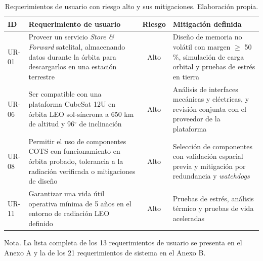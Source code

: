 \begin{table}[H]
\centering
\begin{threeparttable}
\caption{Requerimientos de usuario con riesgo alto y sus mitigaciones. Elaboración propia.\vspace{1ex}}
\label{tab:riesgoalto}
\small
\begin{tabularx}{\textwidth}{|@{\hspace{4pt}}l X c X@{\hspace{4pt}}|}
\toprule
\textbf{ID} & \textbf{Requerimiento de usuario} & \textbf{Riesgo} & \textbf{Mitigación definida} \\
\midrule
UR-01 & Proveer un servicio \textit{Store \& Forward} satelital, almacenando datos durante la órbita para descargarlos en una estación terrestre & Alto & Diseño de memoria no volátil con margen $\geq$ 50\,\%, simulación de carga orbital y pruebas de estrés en tierra \\

UR-06 & Ser compatible con una plataforma CubeSat 12U en órbita LEO sol-síncrona a 650 km de altitud y 96$^{\circ}$ de inclinación & Alto & Análisis de interfaces mecánicas y eléctricas, y revisión conjunta con el proveedor de la plataforma \\

UR-08 & Permitir el uso de componentes COTS con funcionamiento en órbita probado, tolerancia a la radiación verificada o mitigaciones de diseño & Alto & Selección de componentes con validación espacial previa y mitigación por redundancia y \textit{watchdogs} \\

UR-11 & Garantizar una vida útil operativa mínima de 5 años en el entorno de radiación LEO definido & Alto & Pruebas de estrés, análisis térmico y pruebas de vida aceleradas \\
\bottomrule
\end{tabularx}
\begin{tablenotes}[flushleft]\footnotesize
\item Nota. La lista completa de los 13 requerimientos de usuario se presenta en el Anexo A y la de los 21 requerimientos de sistema en el Anexo B.
\end{tablenotes}
\end{threeparttable}
\end{table}

